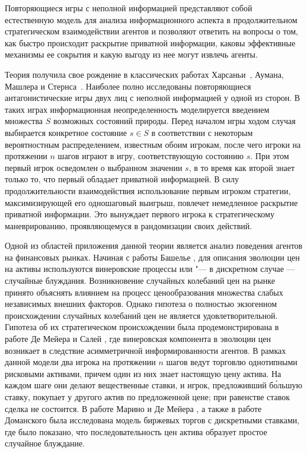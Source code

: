 {\actuality} Повторяющиеся игры с неполной информацией представляют собой
естественную модель для анализа информационного аспекта в продолжительном
стратегическом взаимодействии агентов и позволяют ответить на вопросы о том, как
быстро происходит раскрытие приватной информации, каковы эффективные механизмы
ее сокрытия и какую выгоду из нее могут извлечь агенты.

Теория получила свое рождение в классических работах Харсаньи~\cite{harsanyi67},
Аумана, Машлера и Стернса~\cite{aumann95}. Наиболее полно исследованы
повторяющиеся антагонистические игры двух лиц с неполной информацией у одной из
сторон. В таких играх информационная неопределенность моделируется введением
множества $S$ возможных состояний природы. Перед началом игры ходом случая
выбирается конкретное состояние $s \in S$ в соответствии с некоторым
вероятностным распределением, известным обоим игрокам, после чего игроки на
протяжении $n$ шагов играют в игру, соответствующую состоянию $s$. При этом
первый игрок осведомлен о выбранном значении $s$, в то время как второй знает
только то, что первый обладает приватной информацией. В силу продолжительности
взаимодействия использование первым игроком стратегии, максимизирующей его
одношаговый выигрыш, повлечет немедленное раскрытие приватной информации. Это
вынуждает первого игрока к стратегическому маневрированию, проявляющемуся в
рандомизации своих действий.

Одной из областей приложения данной теории является анализ поведения агентов на
финансовых рынках. Начиная с работы Башелье \cite{bachelier1900}, для описания
эволюции цен на активы используются винеровские процессы или "--- в дискретном
случае --- случайные блуждания. Возникновение случайных колебаний цен на рынке
принято объяснять влиянием на процесс ценообразования множества слабых
независимых внешних факторов. Однако гипотеза о полностью экзогенном
происхождении случайных колебаний цен не является удовлетворительной. Гипотеза
об их стратегическом происхождении была продемонстрирована в работе Де Мейера и
Салей \cite{demeyer02}, где винеровская компонента в эволюции цен возникает в
следствие асимметричной информированности агентов. В рамках данной модели два
игрока на протяжении $n$ шагов ведут торговлю однотипными рисковыми активами,
причем один из них знает настоящую цену актива. На каждом шаге они делают
вещественные ставки, и игрок, предложивший б\'{о}льшую ставку, покупает у
другого актив по предложенной цене; при равенстве ставок сделка не состоится. В
работе Марино и Де Мейера \cite{demeyer05}, а также в работе Доманского
\cite{domansky07} была исследована модель биржевых торгов с дискретными
ставками, где было показано, что последовательность цен актива образует простое
случайное блуждание. 

